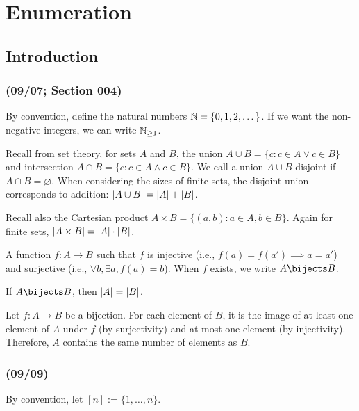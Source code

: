 \part{Enumeration}

\chapter{Introduction}

\section{(09/07; Section 004)}

By convention, define the natural numbers $\mathbb{N} = \{0,1,2,\dotsc\}$.
If we want the non-negative integers, we can write $\mathbb{N}_{\geq1}$.

Recall from set theory, for sets $A$ and $B$,
the union $A \cup B = \{c : c \in A \lor c \in B\}$
and intersection $A \cap B = \{c : c \in A \land c \in B\}$.
We call a union $A \cup B$ disjoint if $A \cap B = \varnothing$.
When considering the sizes of finite sets,
the disjoint union corresponds to addition:
$\abs{A \cup B} = \abs{A} + \abs{B}$.

Recall also the Cartesian product $A \times B = \{(a,b) : a \in A, b \in B\}$.
Again for finite sets, $\abs{A \times B} = \abs{A} \cdot \abs{B}$.

\begin{defn}[bijection]
  A function $f : A \to B$ such that $f$ is injective (i.e., $f(a) = f(a') \implies a = a'$)
  and surjective (i.e., $\forall b, \exists a, f(a) = b$).
  When $f$ exists, we write $A \bijects B$.
\end{defn}

\begin{theorem}
  If $A \bijects B$, then $\abs{A} = \abs{B}$.
\end{theorem}
\begin{prf}
  Let $f : A \to B$ be a bijection.
  For each element of $B$, it is the image of
  at least one element of $A$ under $f$ (by surjectivity)
  and at most one element (by injectivity).
  Therefore, $A$ contains the same number of elements as $B$.
\end{prf}

\section{(09/09)}

By convention, let $[n] := \{1,\dotsc,n\}$.

